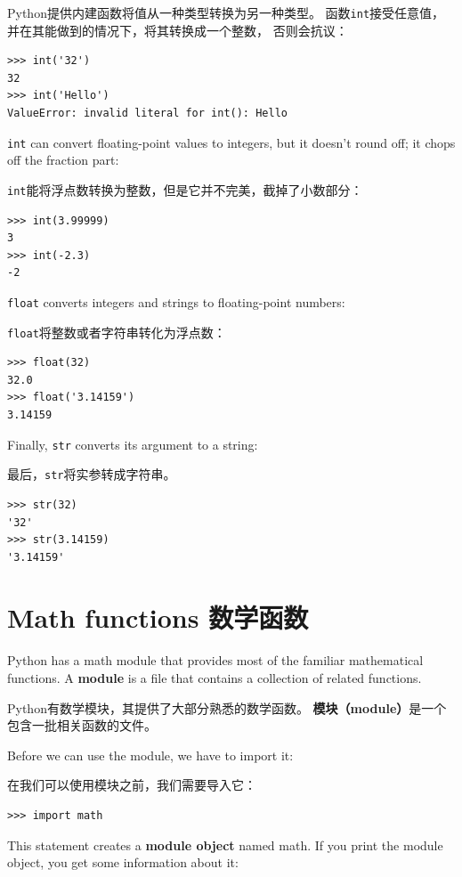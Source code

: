 \documentclass[10pt]{book}
\begin{document}
\begin{CJK}{UTF8}{gbsn}
Python提供内建函数将值从一种类型转换为另一种类型。
函数{\tt int}接受任意值，并在其能做到的情况下，将其转换成一个整数，
否则会抗议：

\begin{verbatim}
>>> int('32')
32
>>> int('Hello')
ValueError: invalid literal for int(): Hello
\end{verbatim}
%
{\tt int} can convert floating-point values to integers, but it
doesn't round off; it chops off the fraction part:

{\tt int}能将浮点数转换为整数，但是它并不完美，截掉了小数部分：

\begin{verbatim}
>>> int(3.99999)
3
>>> int(-2.3)
-2
\end{verbatim}
%
{\tt float} converts integers and strings to floating-point
numbers:

{\tt float}将整数或者字符串转化为浮点数：

\begin{verbatim}
>>> float(32)
32.0
>>> float('3.14159')
3.14159
\end{verbatim}
%
Finally, {\tt str} converts its argument to a string:

最后，{\tt str}将实参转成字符串。

\begin{verbatim}
>>> str(32)
'32'
>>> str(3.14159)
'3.14159'
\end{verbatim}
%



\section{Math functions 数学函数}

Python has a math module that provides most of the familiar
mathematical functions.  A {\bf module} is a file that contains a
collection of related functions.

Python有数学模块，其提供了大部分熟悉的数学函数。
{\bf 模块（module）}是一个包含一批相关函数的文件。

Before we can use the module, we have to import it:

在我们可以使用模块之前，我们需要导入它：

\begin{verbatim}
>>> import math
\end{verbatim}
%
This statement creates a {\bf module object} named math.  If
you print the module object, you get some information about it:


\end{CJK}
\end{document}
